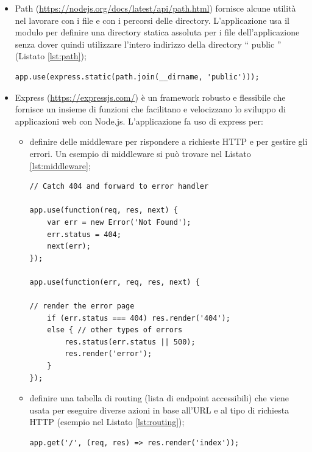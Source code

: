 \documentclass[12pt]{report}
\begin{document}
\begin{itemize}
	\item Path (\url{https://nodejs.org/docs/latest/api/path.html}) fornisce alcune utilità nel lavorare con i file e con i percorsi delle directory. L'applicazione usa il modulo per definire una directory statica assoluta per i file dell'applicazione senza dover quindi utilizzare l'intero indirizzo della directory \textquotedblleft{} public \textquotedblright{} (Listato \ref{lst:path});
\begin{lstlisting}[caption={Uso del modulo \emph{path}.}, label={lst:path}, xleftmargin=\dimexpr-\leftmargini]
app.use(express.static(path.join(__dirname, 'public')));
\end{lstlisting}

	\item Express (\url{https://expressjs.com/}) è un framework robusto e flessibile che fornisce un insieme di funzioni che facilitano e velocizzano lo sviluppo di applicazioni web con Node.js. L'applicazione fa uso di express per:
	\begin{itemize}
		\item definire delle middleware per rispondere a richieste HTTP e per gestire gli errori. Un esempio di middleware si può trovare nel Listato \ref{lst:middleware}; 
\begin{lstlisting}[caption={Middleware per caricare la pagina \textquotedblleft{} 404.ejs \textquotedblright{} nel caso in cui un utente provi ad accedere ad una pagina non esistente}, label={lst:middleware}, xleftmargin=\dimexpr-\leftmarginii-\leftmargini]
// Catch 404 and forward to error handler

app.use(function(req, res, next) {
	var err = new Error('Not Found');
	err.status = 404;
	next(err);
});
	
app.use(function(err, req, res, next) {

// render the error page
	if (err.status === 404) res.render('404');
	else { // other types of errors
		res.status(err.status || 500);
		res.render('error');
	}
});
\end{lstlisting}

		\item definire una tabella di routing (lista di endpoint accessibili) che viene usata per eseguire diverse azioni in base all'URL e al tipo di richiesta HTTP (esempio nel Listato \ref{lst:routing});
\begin{lstlisting}[caption={Implementazione di un endpoint. Quando viene fatta una richiesta GET all'endpoint \emph{\textquotedblleft{} / \textquotedblright{}} allora, come risposta, l'applicazione invia all'utente un file chiamato \textquotedblleft{} index.ejs \textquotedblright{} (che rappresenta la homepage) che viene poi caricato dal suo browser}, label={lst:routing}, xleftmargin=\dimexpr-\leftmarginii-\leftmargini]
app.get('/', (req, res) => res.render('index'));
\end{lstlisting}


\end{itemize}
\end{itemize}
\end{document}
